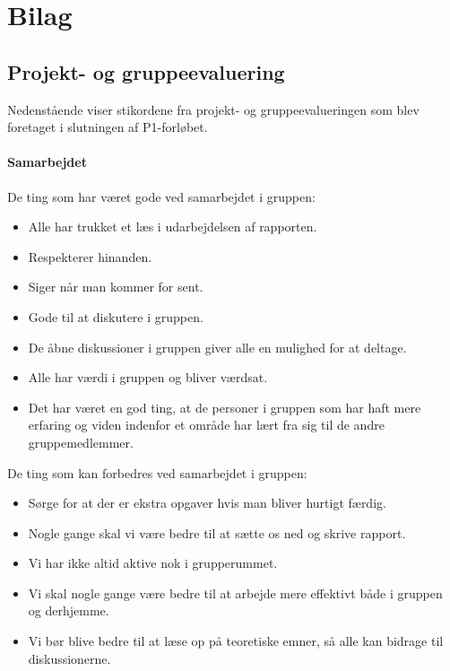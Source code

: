 \documentclass[oneside,a4paper,titlepage]{article}
\begin{document}
\section{Bilag}
\renewcommand{\thesubsection}{\Alph{subsection}}

\subsection{Projekt- og gruppeevaluering}
\label{sec:gruppeevaluering}

Nedenstående viser stikordene fra projekt- og gruppeevalueringen som blev foretaget i slutningen af P1-forløbet.

\paragraph{Samarbejdet}

De ting som har været gode ved samarbejdet i gruppen:
\begin{itemize}
\item Alle har trukket et læs i udarbejdelsen af rapporten. 
\item Respekterer hinanden.
\item Siger når man kommer for sent. 
\item Gode til at diskutere i gruppen. 
\item De åbne diskussioner i gruppen giver alle en mulighed for at deltage. 
\item Alle har værdi i gruppen og bliver værdsat.
\item Det har været en god ting, at de personer i gruppen som har haft mere erfaring og viden indenfor et område har lært fra sig til de andre gruppemedlemmer.
\end{itemize}

De ting som kan forbedres ved samarbejdet i gruppen:
\begin{itemize}
\item Sørge for at der er ekstra opgaver hvis man bliver hurtigt færdig.
\item Nogle gange skal vi være bedre til at sætte os ned og skrive rapport.
\item Vi har ikke altid aktive nok i grupperummet.
\item Vi skal nogle gange være bedre til at arbejde mere effektivt både i gruppen og derhjemme. 
\item Vi bør blive bedre til at læse op på teoretiske emner, så alle kan bidrage til diskussionerne.
\end{itemize}
\end{document}
